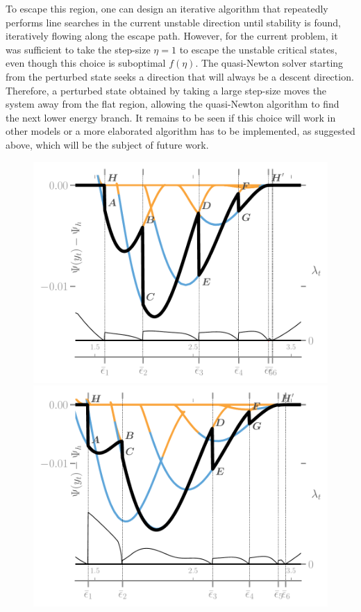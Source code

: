 To escape this region, one can design an iterative algorithm that repeatedly performs line searches in the current unstable direction until stability is found, iteratively flowing along the escape path. However, for the current problem, it was sufficient to take the step-size \( \eta=1 \) to escape the unstable critical states, even though this choice is suboptimal  \( f(\eta) \). 
The quasi-Newton solver starting from the perturbed state seeks a direction that will always be a descent direction. Therefore, a perturbed state obtained by taking a large step-size moves the system away from the flat region, allowing the quasi-Newton algorithm to find the next lower energy branch. It remains to be seen if this choice will work in other models or a more elaborated algorithm has to be implemented, as suggested above, which will be the subject of future work.
\begin{figure}
    \includegraphics[width=.7\textwidth]{../images/model_stiff_energy_kick_algo.pdf} \\
    \includegraphics[width=.7\textwidth]{../images/model_compliant_energy_kick_algo.pdf}
    \caption{
        }
    \label{fig:tempo2}
\end{figure}


